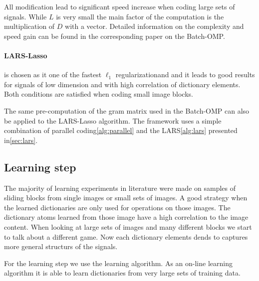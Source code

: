 All modification lead to significant speed increase when coding large sets of
signals. While $L$ is very small the main factor of the computation is
the multiplication of $D$ with a vector. Detailed information on the complexity
and speed gain can be found in the corresponding paper on the
Batch-OMP\cite{Rubinstein2008}. 



\paragraph{LARS-Lasso} is chosen as it one of the fastest $\ell_1$
regularizationand and it leads to good results for signals of low dimension and
with high correlation of dictionary elements. Both conditions are satisfied
when coding small image blocks.

The same pre-computation of the gram matrix used in the Batch-OMP can also
be applied to the LARS-Lasso algorithm. The framework uses a simple combination
of parallel coding\ref{alg:parallel} and the LARS\ref{alg:lars} presented
in\ref{sec:lars}.

\subsection{Learning step}
The majority of learning experiments in literature were made on
samples of sliding blocks from single images or small sets of images.
A good strategy when the learned dictionaries are only used for operations on
those images. The dictionary atoms learned from those image have a high
correlation to the image content.  When looking at large sets of images and many
different blocks we start to talk about a different game. Now each dictionary
elements dends to captures more general structurs of the signals.

For the learning step we use the \trainDL learning algorithm. As an on-line
learning algorithm it is able to learn dictionaries from very large sets of
training data.


